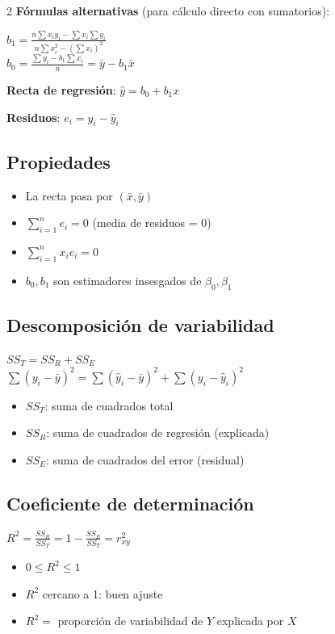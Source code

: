 \documentclass[9pt,a4paper]{article}
\begin{document}
\begin{multicols}{2}
\textbf{Fórmulas alternativas} (para cálculo directo con sumatorios):
\begin{formulabox}
$b_1=\frac{n\sum x_i y_i - \sum x_i \sum y_i}{n\sum x_i^2-(\sum x_i)^2}$\\[5pt]
$b_0=\frac{\sum y_i - b_1\sum x_i}{n}=\bar{y}-b_1\bar{x}$
\end{formulabox}

\textbf{Recta de regresión}: $\hat{y}=b_0+b_1 x$

\textbf{Residuos}: $e_i=y_i-\hat{y}_i$

\subsection{Propiedades}
\begin{itemize}[leftmargin=*]
\item La recta pasa por $(\bar{x},\bar{y})$
\item $\sum_{i=1}^n e_i=0$ (media de residuos = 0)
\item $\sum_{i=1}^n x_i e_i=0$
\item $b_0,b_1$ son estimadores insesgados de $\beta_0,\beta_1$
\end{itemize}

\subsection{Descomposición de variabilidad}
\begin{formulabox}
$SS_T=SS_R+SS_E$\\[3pt]
$\sum(y_i-\bar{y})^2=\sum(\hat{y}_i-\bar{y})^2+\sum(y_i-\hat{y}_i)^2$
\end{formulabox}
\begin{itemize}[leftmargin=*]
\item $SS_T$: suma de cuadrados total
\item $SS_R$: suma de cuadrados de regresión (explicada)
\item $SS_E$: suma de cuadrados del error (residual)
\end{itemize}

\subsection{Coeficiente de determinación}
\begin{formulabox}
$R^2=\frac{SS_R}{SS_T}=1-\frac{SS_E}{SS_T}=r_{xy}^2$
\end{formulabox}

\begin{itemize}[leftmargin=*]
\item $0\leq R^2\leq 1$
\item $R^2$ cercano a 1: buen ajuste
\item $R^2=$ proporción de variabilidad de $Y$ explicada por $X$
\end{itemize}


\end{multicols}
\end{document}
